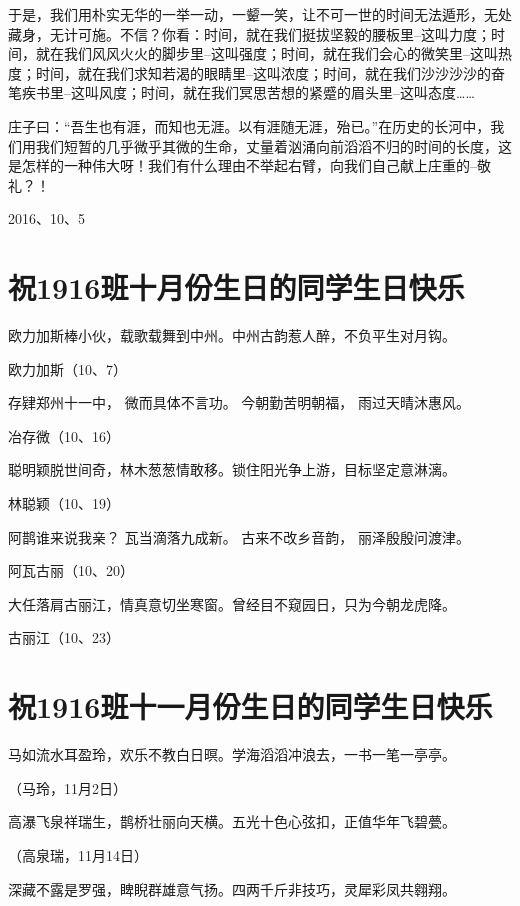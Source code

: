 \documentclass[openany]{ctexbook}
\begin{document}
于是，我们用朴实无华的一举一动，一颦一笑，让不可一世的时间无法遁形，无处藏身，无计可施。不信？你看：时间，就在我们挺拔坚毅的腰板里--这叫力度；时间，就在我们风风火火的脚步里--这叫强度；时间，就在我们会心的微笑里--这叫热度；时间，就在我们求知若渴的眼睛里--这叫浓度；时间，就在我们沙沙沙沙的奋笔疾书里--这叫风度；时间，就在我们冥思苦想的紧蹙的眉头里--这叫态度\ldots{}\ldots{}

庄子曰：``吾生也有涯，而知也无涯。以有涯随无涯，殆已。''在历史的长河中，我们用我们短暂的几乎微乎其微的生命，丈量着汹涌向前滔滔不归的时间的长度，这是怎样的一种伟大呀！我们有什么理由不举起右臂，向我们自己献上庄重的--敬礼？！

2016、10、5

\chapter*{祝1916班十月份生日的同学生日快乐}\label{birthday10}

欧力加斯棒小伙，载歌载舞到中州。中州古韵惹人醉，不负平生对月钩。

欧力加斯（10、7）

存肄郑州十一中， 微而具体不言功。 今朝勤苦明朝福， 雨过天晴沐惠风。

冶存微（10、16）

聪明颖脱世间奇，林木葱葱情敢移。锁住阳光争上游，目标坚定意淋漓。

林聪颖（10、19）

阿鹊谁来说我亲？ 瓦当滴落九成新。 古来不改乡音韵， 丽泽殷殷问渡津。

阿瓦古丽（10、20）

大任落肩古丽江，情真意切坐寒窗。曾经目不窥园日，只为今朝龙虎降。

古丽江（10、23）

\chapter*{祝1916班十一月份生日的同学生日快乐}\label{birthday11}

马如流水耳盈玲，欢乐不教白日暝。学海滔滔冲浪去，一书一笔一亭亭。

（马玲，11月2日）

高瀑飞泉祥瑞生，鹊桥壮丽向天横。五光十色心弦扣，正值华年飞碧甍。

（高泉瑞，11月14日）

深藏不露是罗强，睥睨群雄意气扬。四两千斤非技巧，灵犀彩凤共翱翔。
\end{document}
